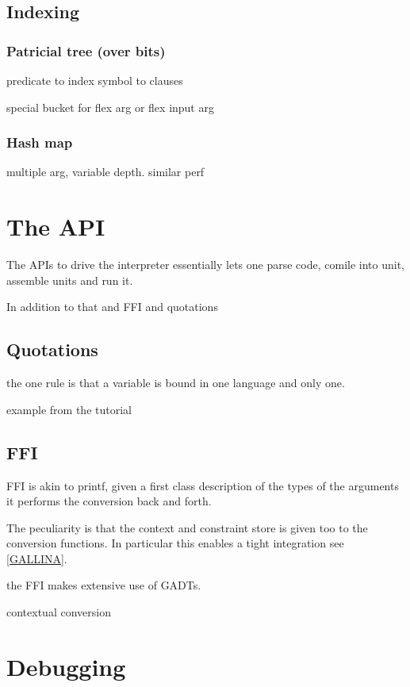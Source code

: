 \documentclass[a4paper, 11pt]{book}
\begin{document}
\subsection{Indexing}
\subsubsection{Patricial tree (over bits)}

predicate to index
symbol to clauses

special bucket for flex arg or flex input arg

\subsubsection{Hash map}

multiple arg, variable depth. similar perf


\section{The API}

The APIs to drive the interpreter essentially lets one parse code, comile into
unit, assemble units and run it.

In addition to that and FFI and quotations

\subsection{Quotations}

the one rule is that a variable is bound in one language and only
one.

example from the tutorial

\subsection{FFI}\label{FFI}

FFI is akin to printf, given a first class description of
the types of the arguments it performs the conversion
back and forth.

The peculiarity is that the context and constraint store
is given too to the conversion functions. In particular
this enables a tight integration see \ref{GALLINA}.

the FFI makes extensive use of GADTs.

contextual conversion

\section{Debugging}
\end{document}
